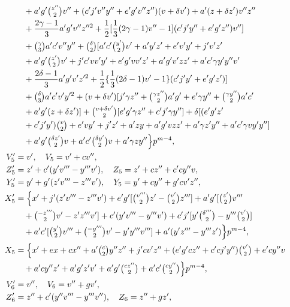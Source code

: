 \documentclass[oneside]{article}
\begin{document}
\begin{align*}
  &\quad+ a'g'\tbinom{z''}{2}v'' + (c'j'v''y'' + e'g'v''z'')(v + \delta v')
     + a'(z + \delta z')v''z'' \\
  &\quad+ \frac{2\gamma - 1}{3}a'g'v''z''^2 + \frac{1}{2}[\frac{1}{3}(2\gamma - 1)v''
     - 1](c'j'y'' + e'g'z'')v''] \\
  &\quad+ \tbinom{\gamma}{3}a'c'v''y'' + \tbinom{\delta}{2}[a'c'\tbinom{y'}{2}v'
     + a'y'z' + e'v'y' + j'v'z' \\
  &\quad+ a'g'\tbinom{z'}{2}v' + j'c'vv'y' + e'g'vv'z' + a'g'v'zz' + a'c'\gamma y'y''v' \\
  &\quad+ \frac{2\delta - 1}{3}a'g'v'z'^2 + \frac{1}{2}\{\frac{1}{3}(2\delta - 1)v'
     - 1\}(c'j'y' + e'g'z')] \\
  &\quad+ \tbinom{\delta}{3}a'c'v'y'^2 + (v + \delta v')[j'\gamma z''
     + \tbinom{\gamma z''}{2}a'g' + e'\gamma y'' + \tbinom{\gamma y''}{2}a'c' \\
  &\quad+ a'g'(z + \delta z')] + \tbinom{v + \delta v'}{2}[e'g'\gamma z''
     + c'j'\gamma y''] + \delta[(e'g'z' \\
  &\quad+ c'j'y')\tbinom{v}{2} + e'vy' + j'z' + a'zy + a'g'vzz' + a'\gamma z'y''
     + a'c'\gamma vy'y''] \\
  &\quad+ a'g'\tbinom{\delta z'}{2}v + a'c'\tbinom{\delta y'}{2} v
     + a'\gamma zy''\Bigr\}p^{m-4}, \\
V'_5 &= v', \quad V_5 = v' + cv'', \\
Z'_5 &= z' + c'(y'v''' - y'''v'), \quad Z_5 = z' + cz'' + c'cy''v, \\
Y'_5 &= y' + g'(z'v''' - z'''v'), \quad Y_5 = y' + cy'' + g'cv'z'', \\
X'_5 &= \Bigl\{x' + j'(z'v''' - z'''v') + e'g'[\tbinom{v'''}{2}z'
     - \tbinom{v'}{2}z'''] + a'g'[\tbinom{z'}{2}v''' \\
  &\quad+ \tbinom{-z'''}{2}v' - z'z'''v'] + c'(y'v''' - y'''v')
     + c'j'[y'\tbinom{\delta'''}{2} - y'''\tbinom{v'}{2}] \\
  &\quad+ a'c'[\tbinom{y'}{2}v''' + \tbinom{-y'''}{2}v' - y'y'''v''']
     + a'(y'z''' - y'''z')\Bigr\}p^{m-4}, \\
X_5 &= \Bigl\{x' + ex + cx'' + a'\tbinom{c}{2}y''z'' + j'cv'z''
     + (e'g'cz'' + c'cj'y'')\tbinom{v'}{2} + e'cy''v \\
  &\quad+ a'cy''z' + a'g'z'v' + a'g'\tbinom{cz''}{2} + a'c'\tbinom{cy''}{2}\Bigr\}p^{m-4}, \\
V'_6 &= v'', \quad V_6 = v'' + gv', \\
Z'_6 &= z'' + c'(y''v''' - y'''v''), \quad Z_6 = z'' + gz', \\

\end{align*}
\end{document}

